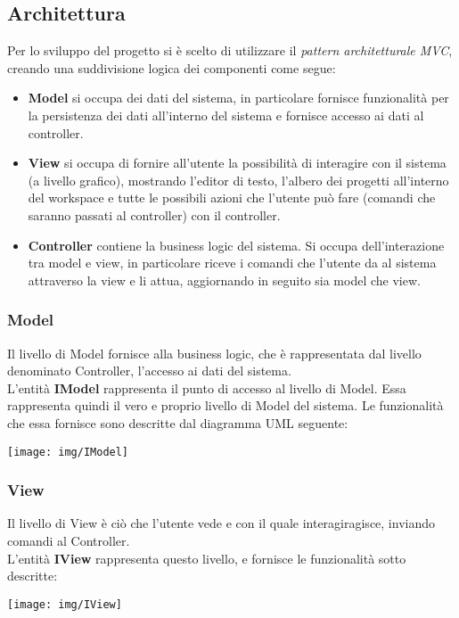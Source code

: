 \documentclass{article}
\begin{document}
  \subsection{Architettura}
  Per lo sviluppo del progetto si è scelto di utilizzare il \textit{pattern architetturale MVC}, creando una suddivisione logica dei componenti come segue:
  \begin{itemize}
    \item \textbf{Model} si occupa dei dati del sistema, in particolare fornisce funzionalità per la persistenza dei dati all'interno del sistema e fornisce
    accesso ai dati al controller.
    \item \textbf{View} si occupa di fornire all'utente la possibilità di interagire con il sistema (a livello grafico), mostrando l'editor
    di testo, l'albero dei progetti all'interno del workspace e tutte le possibili azioni che l'utente può fare (comandi che saranno passati al controller)
    con il controller.
    \item \textbf{Controller} contiene la business logic del sistema. Si occupa dell'interazione tra model e view, in particolare riceve i comandi che l'utente da al sistema
    attraverso la view e li attua, aggiornando in seguito sia model che view.
  \end{itemize}
  \subsubsection{Model}
  Il livello di Model fornisce alla business logic, che è rappresentata dal livello denominato Controller, l'accesso ai dati del sistema.\\
  L'entità \textbf{IModel} rappresenta il punto di accesso al livello di Model. Essa rappresenta quindi il vero e
  proprio livello di Model del sistema. Le funzionalità che essa fornisce sono descritte dal diagramma UML seguente:
  \begin{center}
    \texttt{[image: img/IModel]}
  \end{center}
  \subsubsection{View}
  Il livello di View è ciò che l'utente vede e con il quale interagiragisce, inviando comandi al Controller.\\
  L'entità \textbf{IView} rappresenta questo livello, e fornisce le funzionalità sotto descritte:
  \begin{center}
    \texttt{[image: img/IView]}
  \end{center}
\end{document}
